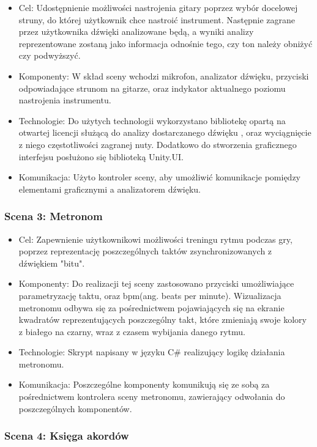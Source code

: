 \begin{itemize}
\item Cel: Udostępnienie możliwości nastrojenia gitary poprzez wybór docelowej struny, do której użytkownik chce nastroić instrument. Następnie zagrane przez użytkownika dźwięki analizowane będą, a wyniki analizy reprezentowane zostaną jako informacja odnośnie tego, czy ton należy obniżyć czy podwyższyć.
\item Komponenty: W skład sceny wchodzi mikrofon, analizator dźwięku, przyciski odpowiadające strunom na gitarze, oraz indykator aktualnego poziomu nastrojenia instrumentu.  
\item Technologie: Do użytych technologii wykorzystano bibliotekę opartą na otwartej licencji służącą do analizy dostarczanego dźwięku \cite{https://github.com/nakakq/AudioPitchEstimatorForUnity}, oraz wyciągnięcie z niego częstotliwości zagranej nuty. Dodatkowo do stworzenia graficznego interfejsu posłużono się biblioteką Unity.UI.   
\item Komunikacja: Użyto kontroler sceny, aby umożliwić komunikacje pomiędzy elementami graficznymi a analizatorem dźwięku. 
\end{itemize}

\subsubsection{Scena 3: Metronom}

\begin{itemize}
\item Cel: Zapewnienie użytkownikowi możliwości treningu rytmu podczas gry, poprzez reprezentację poszczególnych taktów zsynchronizowanych z dźwiękiem "bitu".
\item Komponenty: Do realizacji tej sceny zastosowano przyciski umożliwiające parametryzację taktu, oraz bpm(ang. beats per minute). Wizualizacja metronomu odbywa się za pośrednictwem pojawiających się na ekranie kwadratów reprezentujących poszczególny takt, które zmieniają swoje kolory z białego na czarny, wraz z czasem wybijania danego rytmu.
\item Technologie: Skrypt napisany w języku C\# realizujący logikę działania metronomu.
\item Komunikacja: Poszczególne komponenty komunikują się ze sobą za pośrednictwem kontrolera sceny metronomu, zawierający odwołania do poszczególnych komponentów.
\end{itemize}

\subsubsection{Scena 4: Księga akordów}

